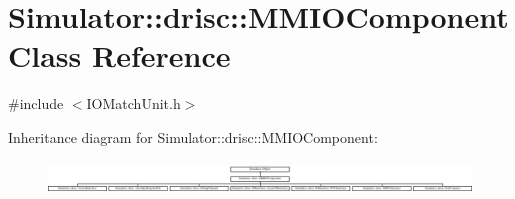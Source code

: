 \hypertarget{class_simulator_1_1drisc_1_1_m_m_i_o_component}{\section{Simulator\+:\+:drisc\+:\+:M\+M\+I\+O\+Component Class Reference}
\label{class_simulator_1_1drisc_1_1_m_m_i_o_component}
}


{\ttfamily \#include $<$I\+O\+Match\+Unit.\+h$>$}

Inheritance diagram for Simulator\+:\+:drisc\+:\+:M\+M\+I\+O\+Component\+:\begin{figure}[H]
\begin{center}
\leavevmode
\includegraphics[height=0.857143cm]{class_simulator_1_1drisc_1_1_m_m_i_o_component}
\end{center}
\end{figure}
